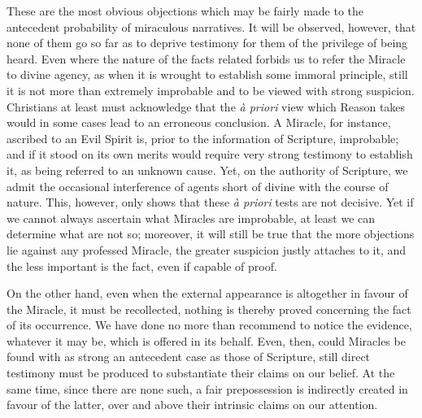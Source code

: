 These are the most obvious objections which may
be fairly made to the antecedent probability of miraculous narratives.
It will be observed, however, that none of them go so far as to
deprive testimony for them of the privilege of being heard. Even where
the nature of the facts related forbids us to refer the Miracle to
divine agency, as when it is wrought to establish some immoral
principle, still it is not more than extremely improbable and to be
viewed with strong suspicion. Christians at least must acknowledge
that the \emph{à priori} view which Reason takes would in some cases
lead to an erroneous conclusion. A Miracle, for instance, ascribed to
an Evil Spirit is, prior to the information of Scripture,
improbable; and if it stood on its own merits would require very
strong testimony to establish it, as being referred to an unknown
cause. Yet, on the authority of Scripture, we admit the occasional
interference of agents short of divine with the course of nature.
This, however, only shows that these \emph{à priori} tests are not
decisive. Yet if we cannot always ascertain what Miracles are
improbable, at least we can determine what are not so; moreover, it
will still be true that the more objections lie against any professed
Miracle, the greater suspicion justly attaches to it, and the less
important is the fact, even if capable of proof.

On the other hand, even when the external
appearance is altogether in favour of the Miracle, it must be
recollected, nothing is thereby proved concerning the fact of its
occurrence. We have done no more than recommend to notice the
evidence, whatever it may be, which is offered in its behalf. Even,
then, could Miracles be found with as strong an antecedent case as
those of Scripture, still direct testimony must be produced to
substantiate their claims on our belief. At the same time, since there
are none such, a fair prepossession is indirectly created in favour of
the latter, over and above their intrinsic claims on our attention.

